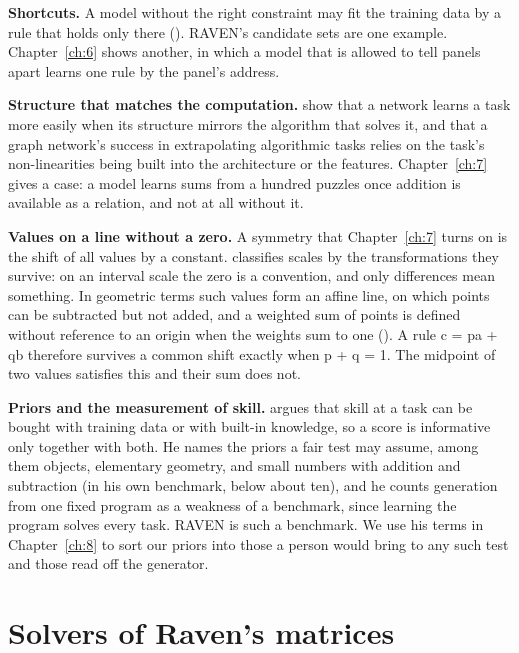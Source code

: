 \textbf{Shortcuts.} A model without the right constraint may fit the training data by a rule that holds only there (\citealp{geirhos2020shortcut}). RAVEN's candidate sets are one example. Chapter~\ref{ch:6} shows another, in which a model that is allowed to tell panels apart learns one rule by the panel's address.

\textbf{Structure that matches the computation.} \citet{xu2020what} show that a network learns a task more easily when its structure mirrors the algorithm that solves it, and \citet{xu2021how} that a graph network's success in extrapolating algorithmic tasks relies on the task's non-linearities being built into the architecture or the features. Chapter~\ref{ch:7} gives a case: a model learns sums from a hundred puzzles once addition is available as a relation, and not at all without it.

\textbf{Values on a line without a zero.} A symmetry that Chapter~\ref{ch:7} turns on is the shift of all values by a constant. \citet{stevens1946theory} classifies scales by the transformations they survive: on an interval scale the zero is a convention, and only differences mean something. In geometric terms such values form an affine line, on which points can be subtracted but not added, and a weighted sum of points is defined without reference to an origin when the weights sum to one (\citealp[Lemma 2.2.1]{gallier2011geometric}). A rule c = pa + qb therefore survives a common shift exactly when p + q = 1. The midpoint of two values satisfies this and their sum does not.

\textbf{Priors and the measurement of skill.} \citet{chollet2019measure} argues that skill at a task can be bought with training data or with built-in knowledge, so a score is informative only together with both. He names the priors a fair test may assume, among them objects, elementary geometry, and small numbers with addition and subtraction (in his own benchmark, below about ten), and he counts generation from one fixed program as a weakness of a benchmark, since learning the program solves every task. RAVEN is such a benchmark. We use his terms in Chapter~\ref{ch:8} to sort our priors into those a person would bring to any such test and those read off the generator.

\section{Solvers of Raven's matrices}\label{sec:2.5}


